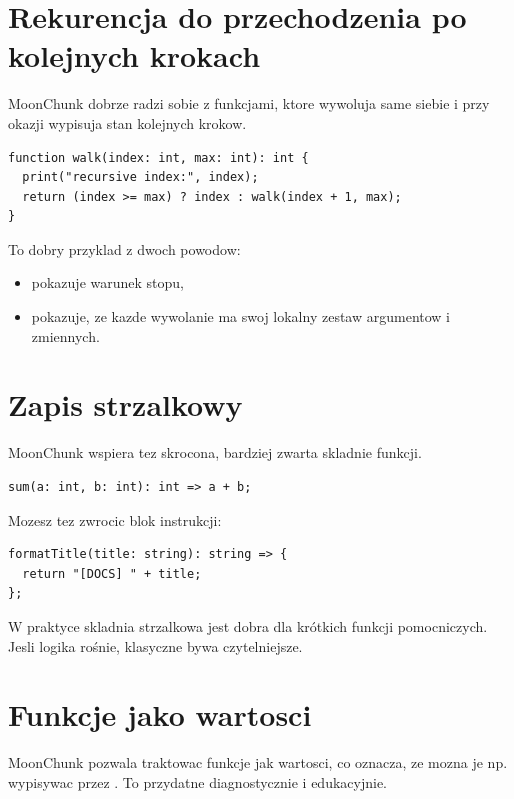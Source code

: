 \section{Rekurencja do przechodzenia po kolejnych krokach}
MoonChunk dobrze radzi sobie z funkcjami, ktore wywoluja same siebie i przy okazji
wypisuja stan kolejnych krokow.

\begin{lstlisting}[style=moonchunk,caption={Rekurencja z licznikiem lokalnym}]
function walk(index: int, max: int): int {
  print("recursive index:", index);
  return (index >= max) ? index : walk(index + 1, max);
}
\end{lstlisting}

To dobry przyklad z dwoch powodow:

\begin{itemize}
  \item pokazuje warunek stopu,
  \item pokazuje, ze kazde wywolanie ma swoj lokalny zestaw argumentow i zmiennych.
\end{itemize}

\section{Zapis strzalkowy}
MoonChunk wspiera tez skrocona, bardziej zwarta skladnie funkcji.

\begin{lstlisting}[style=moonchunk,caption={Funkcja w skladni strzalkowej}]
sum(a: int, b: int): int => a + b;
\end{lstlisting}

Mozesz tez zwrocic blok instrukcji:

\begin{lstlisting}[style=moonchunk,caption={Strzalka z blokiem instrukcji}]
formatTitle(title: string): string => {
  return "[DOCS] " + title;
};
\end{lstlisting}

W praktyce skladnia strzalkowa jest dobra dla krótkich funkcji pomocniczych.
Jesli logika rośnie, klasyczne  bywa czytelniejsze.

\section{Funkcje jako wartosci}
MoonChunk pozwala traktowac funkcje jak wartosci, co oznacza, ze mozna je np. wypisywac
przez . To przydatne diagnostycznie i edukacyjnie.


